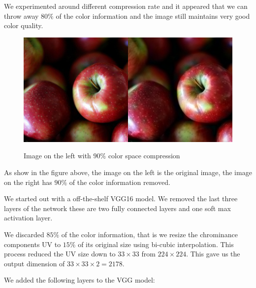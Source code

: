 \documentclass[12pt]{article}
\begin{document}
We experimented around different compression rate and it appeared that we can throw away $80\%$ of the color information and the image still maintains very good color quality. 


\begin{figure}[H]
 \centering
  \includegraphics[width=5.0in]{resource/colorcompress.png}
 \label{yuvimage}
 \caption{Image on the left with $90\%$ color space compression}
\end{figure}

As show in the figure above, the image on the left is the original image, the image on the right has $90\%$ of the color information removed.

We started out with a off-the-shelf VGG16 model. We removed the last three layers of the network these are two fully connected layers and one soft max activation layer. 

We discarded $85\%$ of the color information, that is we resize the chrominance components UV to $15\%$ of its original size using bi-cubic interpolation. This process reduced the UV size down to $33\times33$ from $224\times224$. This gave us the output dimension of $33\times33\times2=2178$. 

We added the following layers to the VGG model:
\end{document}
